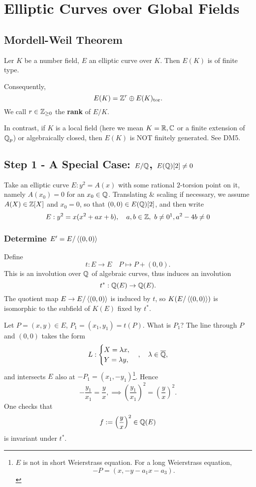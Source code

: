 \section{Elliptic Curves over Global Fields}

\subsection{Mordell-Weil Theorem}
\begin{theorem}
    Ler $K$ be a number field, $E$ an elliptic curve over $K$.
    Then $E(K)$ is of finite type.
\end{theorem}
Consequently, \[E(K) = \mathbb{Z}^r\oplus E(K)_{\mathrm{tor}}.\]
We call $r\in\mathbb{Z}_{\ge 0}$ the \textbf{rank} of $E/K$.
\begin{remark}
    In contrast, if $K$ is a local field (here we mean $K = \mathbb{R}, \mathbb{C}$ or a finite extension of $\mathbb{Q}_p$) or algebraically closed,
    then $E(K)$ is NOT finitely generated. See DM5.
\end{remark}

\subsection{Step 1 - A Special Case: \texorpdfstring{$E/\mathbb{Q}$, $E(\mathbb{Q})[2]\ne 0$}{E/Q, E(Q)[2] ne 0}}
Take an elliptic curve $E : y^2 = A(x)$ with some rational $2$-torsion point on it,
namely $A(x_0) = 0$ for an $x_0\in\mathbb{Q}$.
Translating \& scaling if necessary, we assume $A(X)\in\mathbb{Z}[X]$ and $x_0 = 0$,
so that $(0, 0)\in E(\mathbb{Q})[2]$, and then write
\[E : y^2 = x(x^2 + ax + b),\quad a, b\in\Z,\ b\ne 0\footnotemark, a^2 - 4b\ne 0\]

\subsubsection*{Determine \texorpdfstring{$E' = E/\left\langle (0, 0) \right\rangle$}{E' = E/<(0, 0)>}}

Define \[t : E\to E\quad P\mapsto P + (0, 0).\]
This is an involution over $\mathbb{Q}$ of algebraic curves, thus induces an involution
\[t^* : \mathbb{Q}(E)\to \mathbb{Q}(E).\]
The quotient map $E\to E/\left\langle (0, 0) \right\rangle$ is induced by $t$,
so $K(E/\left\langle (0, 0) \right\rangle)$ is isomorphic to the subfield of $K(E)$ fixed by $t^*$.

Let $P = (x, y)\in E$, $P_1 = (x_1, y_1) = t(P)$.
What is $P_1$? The line through $P$ and $(0, 0)$ takes the form
\[L : \begin{cases}
    X = \lambda x,\\ Y = \lambda y,
\end{cases},\quad \lambda\in\overline{\mathbb{Q}},\]
and intersects $E$ also at $-P_1 = (x_1, -y_1)$\footnote{
    $E$ is not in short Weierstrass equation.
    For a long Weierstrass equation,
    \[-P = \left( x, -y-a_1x-a_3 \right).\]
}.
Hence \[-\frac{y_1}{x_1} = \frac{y}{x},\implies \left( \frac{y_1}{x_1} \right)^2 = \left( \frac{y }{x } \right)^2.\]
One checks that \[f := \left( \frac{y }{x } \right)^2\in \mathbb{Q}(E)\]is invariant under $t^*$.

